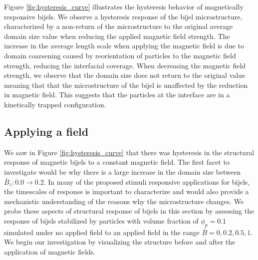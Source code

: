 Figure \ref{fig:hysteresis_curve} illustrates the hysteresis behavior of magnetically responsive bijels. 
We observe a hysteresis response of the bijel microstructure, characterized by a non-return of the microstructure 
to the original average domain size value when reducing the applied magnetic field strength. The increase in the 
average length scale when applying the magnetic field is due to domain coarsening caused by reorientation of particles 
to the magnetic field strength, reducing the interfacial coverage. When decreasing the magnetic field strength, 
we observe that the domain size does not return to the original value meaning that that the microstructure of the 
bijel is unaffected by the reduction in magnetic field. This suggests that the particles at the interface are in a 
kinetically trapped configuration.

\subsection{Applying a field}

We saw in Figure \ref{fig:hysteresis_curve} that there was hysteresis in the structural response of magnetic bijels 
to a constant magnetic field. The first facet to investigate would be why there is a large increase in the domain size 
between $\bar{B}_z: 0.0 \rightarrow 0.2$. In many of the proposed stimuli responsive applications for bijels, the 
timescales of response is important to characterize and would also provide a mechanistic understanding of the reasons 
why the microstructure changes. We probe these aspects of structural response of bijels in this section by assessing 
the response of bijels stabilized by particles with volume fraction of $\phi_p = 0.1$ simulated under no applied field 
to an applied field in the range $\bar{B} = 0, 0.2, 0.5, 1$. We begin our investigation by visualizing the structure 
before and after the application of magnetic fields. 

